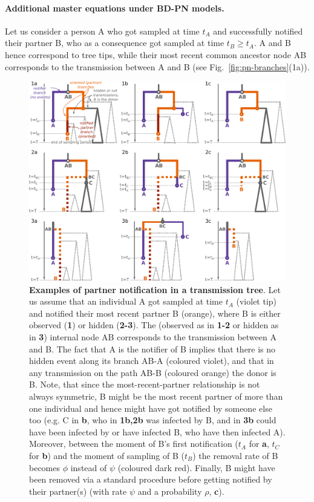 \documentclass[10pt,letterpaper]{article}
\begin{document}
\paragraph{Additional master equations under BD-PN models.}

Let us consider a person A who got sampled at time $t_A$ and successfully notified their partner B, who as a consequence got sampled at time $t_B \geq t_A$. A and B hence correspond to tree tips, while their most recent common ancestor node AB corresponds to the transmission between A and B (see Fig.~\ref{fig:pn-branches}(1a)).



\begin{figure}[h!]
\centering 
\includegraphics[width=1\textwidth]{Fig_PNbranches}
\caption{\textbf{Examples of partner notification in a transmission tree}. Let us assume that an individual A got sampled at time $t_A$ (violet tip) and notified their most recent partner B (orange), where B is either observed (\textbf{1}) or hidden (\textbf{2-3}). 
The (observed as in \textbf{1-2} or hidden as in \textbf{3}) internal node AB corresponds to the transmission between A and B. The fact that A is the notifier of B implies that there is no hidden event along its branch AB-A (coloured violet), and that in any transmission on the path AB-B (coloured orange) the donor is B. Note, that since the most-recent-partner relationship is not always symmetric, B might be the most recent partner of more than one individual and hence might have got notified by someone else too (e.g. C in \textbf{b}, who in \textbf{1b,2b} was infected by B, and in \textbf{3b} could have been infected by or have infected B, who have then infected A). Moreover, between the moment of B's first notification ($t_A$ for \textbf{a}, $t_C$ for \textbf{b}) and the moment of sampling  of B ($t_B$) the removal rate of B becomes $\phi$ instead of $\psi$ (coloured dark red). Finally, B might have been removed via a standard procedure before getting notified by their partner(s) (with rate $\psi$ and a probability $\rho$, \textbf{c}).
}
\end{figure}
\end{document}
